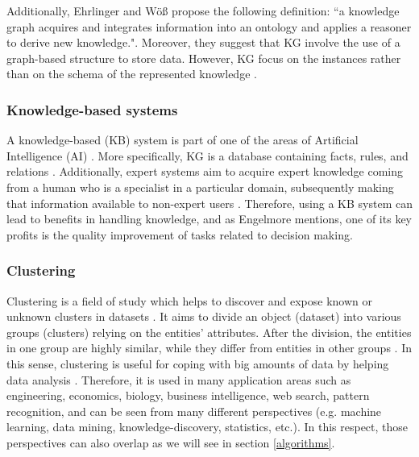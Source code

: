 \documentclass[runningheads]{llncs}
\begin{document}
Additionally, Ehrlinger and W{\"o}{\ss} \cite{Ehrlinger} propose the following definition: ``a knowledge graph acquires and integrates information into an ontology and applies a reasoner to derive new knowledge.". Moreover, they suggest that KG involve the use of a graph-based structure to store data. However, KG focus on the instances rather than on the schema of the represented knowledge \cite{Paulheim}.


\subsubsection{Knowledge-based systems} \label{knowledge-based}
A knowledge-based (KB) system is part of one of the areas of Artificial Intelligence (AI) \cite{Tripathi}. More specifically, KG is a database containing facts, rules, and relations \cite{Engelmore}. Additionally, expert systems aim to acquire expert knowledge coming from a human who is a specialist in a particular domain, subsequently making that information available to non-expert users \cite{Tripathi}.
Therefore, using a KB system can lead to benefits in handling knowledge, and as Engelmore \cite{Engelmore} mentions, one of its key profits is the quality improvement of tasks related to decision making.


\subsubsection{Clustering} \label{clustering}
Clustering is a field of study which helps to discover and expose known or unknown clusters in datasets \cite{Han} \cite{Mirkin}. It aims to divide an object (dataset) into various groups (clusters) relying on the entities' attributes. After the division, the entities in one group are highly similar, while they differ from entities in other groups \cite{Han}. In this sense, clustering is useful for coping with big amounts of data by helping data analysis \cite{Pedrycz} \cite{Mirkin}. Therefore, it is used in many application areas such as engineering, economics, biology, business intelligence, web search, pattern recognition, \cite{Pedrycz} \cite{Han} and can be seen from many different perspectives (e.g. machine learning, data mining, knowledge-discovery, statistics, etc.). In this respect, those perspectives can also overlap as we will see in section \ref{algorithms}.
\end{document}
